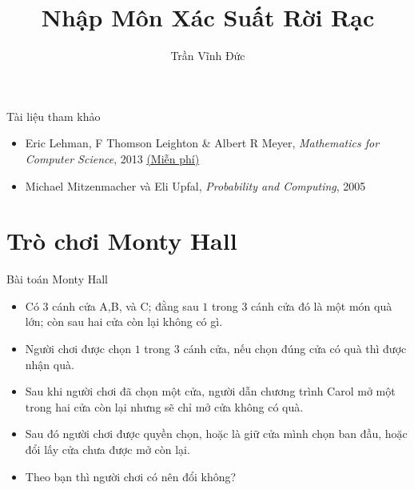 %


\title{Nhập Môn Xác Suất Rời Rạc} 
 \author{Trần Vĩnh Đức}    
 
\maketitle

\begin{frame}{Tài liệu tham khảo}
  \begin{itemize}
  \item Eric Lehman, F Thomson Leighton \& Albert R Meyer,
    \textit{Mathematics for Computer Science}, 2013
    \href{https://www.seas.harvard.edu/courses/cs20/MIT6_042Notes.pdf}{\color{blue}(Miễn
    phí)}
  \item Michael Mitzenmacher và Eli Upfal, \textit{Probability and Computing}, 2005
  \end{itemize}
\end{frame}

\section{Trò chơi Monty Hall}
\begin{frame}{Bài toán Monty Hall}
  \begin{itemize}
  \item Có $3$ cánh cửa A,B, và C; đằng sau $1$ trong $3$ cánh cửa đó là một món quà lớn; còn sau hai cửa còn lại không có gì.
  \item Người chơi được chọn $1$ trong $3$ cánh cửa, nếu chọn đúng cửa có quà thì được nhận quà.
  \item Sau khi người chơi đã chọn một cửa, người dẫn chương trình Carol  mở một trong hai cửa còn lại nhưng sẽ chỉ mở cửa không có quà.
  \item Sau đó người chơi được quyền chọn, hoặc là giữ cửa mình chọn ban đầu, hoặc đổi lấy cửa chưa được mở còn lại.
  \item Theo bạn thì người chơi có nên đổi không?
  \end{itemize}
\end{frame}

